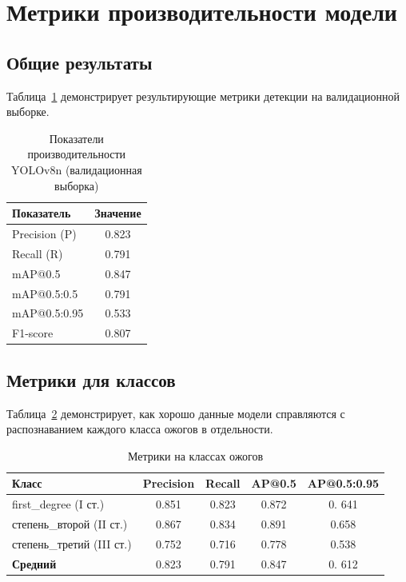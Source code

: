 \section{Метрики производительности модели}

\subsection{Общие результаты}

Таблица~\ref{tab:metrics} демонстрирует результирующие метрики детекции на валидационной выборке. \begin{table}[H]
\centering
\caption{Показатели производительности YOLOv8n (валидационная выборка)}
\label{tab:metrics}
\begin{tabular}{lc}
\toprule
\textbf{Показатель} & \textbf{Значение} \\
\midrule
Precision (P) & 0.823 \\
Recall (R) & 0.791 \\
mAP@0.5 & 0.847 \\
mAP@0.5:0.5 & 0.791 \\
mAP@0.5:0.95 & 0.533 \\
F1-score & 0.807 \\
\bottomrule
\end{tabular}
\end{table}

\subsection{Метрики для классов}

Таблица~\ref{tab:per_class} демонстрирует, как хорошо данные модели справляются с распознаванием каждого класса ожогов в отдельности. \begin{table}[H]
\centering
\caption{Метрики на классах ожогов}
\label{tab:per_class}
\begin{tabular}{lcccc}
\toprule
\textbf{Класс} & \textbf{Precision} & \textbf{Recall} & \textbf{AP@0.5} & \textbf{AP@0.5:0.95} \\
\midrule
first\_degree (I ст.) & 0.851 & 0.823 & 0.872 & 0. 641 \\
степень\_второй (II ст.) & 0.867 & 0.834 & 0.891 & 0.658 \\
степень\_третий (III ст.) & 0.752 & 0.716 & 0.778 & 0.538 \\
\midrule
\textbf{Средний} & 0.823 & 0.791 & 0.847 & 0. 612 \\
\bottomrule
\end{tabular}
\end{table}

